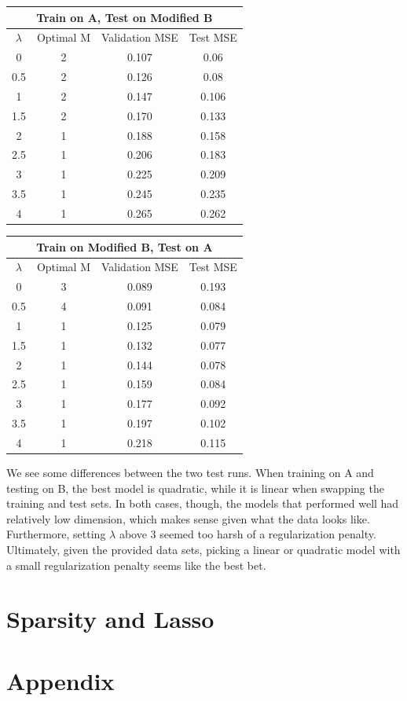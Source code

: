 \documentclass{article}
\begin{document}
\begin{center}
 \begin{tabular}{||c c c c||} 
 \hline
 \multicolumn{4}{|c|}{Train on A, Test on Modified B} \\
 \hline
 \hline
 $\lambda$ & Optimal M & Validation MSE & Test MSE\\ [0.5ex] 
 \hline\hline
 0 & 2 & 0.107 & 0.06 \\ 
 \hline
 0.5 & 2 & 0.126 & 0.08 \\
 \hline
 1 & 2 & 0.147 & 0.106 \\
 \hline
 1.5 & 2 & 0.170 & 0.133 \\
 \hline
2 & 1 & 0.188 & 0.158 \\
 \hline
2.5 & 1 & 0.206 & 0.183 \\
 \hline
3 & 1 & 0.225 & 0.209 \\
 \hline
 3.5 & 1 & 0.245 & 0.235 \\
 \hline
4 & 1 & 0.265 & 0.262 \\
 \hline
\end{tabular}
\quad
 \begin{tabular}{||c c c c||} 
 \hline
 \multicolumn{4}{|c|}{Train on Modified B, Test on A} \\
 \hline
 \hline
 $\lambda$ & Optimal M & Validation MSE & Test MSE\\ [0.5ex] 
 \hline\hline
 0 & 3 & 0.089 & 0.193 \\ 
 \hline
 0.5 & 4 & 0.091 & 0.084 \\
 \hline
 1 & 1 & 0.125 & 0.079 \\
 \hline
 1.5 & 1 & 0.132 & 0.077 \\
 \hline
2 & 1 & 0.144 & 0.078 \\
 \hline
2.5 & 1 & 0.159 & 0.084 \\
 \hline
3 & 1 & 0.177 & 0.092 \\
 \hline
 3.5 & 1 & 0.197 & 0.102 \\
 \hline
4 & 1 & 0.218 & 0.115 \\
 \hline
\end{tabular}
\end{center}

We see some differences between the two test runs. When training on A and testing on B, the best model is quadratic, while it is linear when swapping the training and test sets. In both cases, though, the models that performed well had relatively low dimension, which makes sense given what the data looks like. Furthermore, setting $\lambda$ above 3 seemed too harsh of a regularization penalty. Ultimately, given the provided data sets, picking a linear or quadratic model with a small regularization penalty seems like the best bet.


\section{Sparsity and Lasso}

\section{Appendix}
\end{document}
